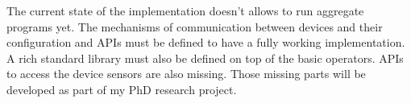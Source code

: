 The current state of the \Kotac{} implementation doesn't allows to run aggregate programs yet. The mechanisms of communication between devices and their configuration and APIs must be defined to have a fully working implementation. A rich standard library must also be defined on top of the basic operators. APIs to access the device sensors are also missing. Those missing parts will be developed as part of my PhD research project.